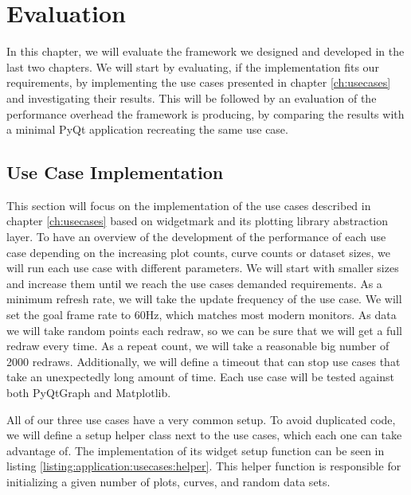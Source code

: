 
\chapter{Evaluation}
\label{ch:evaluation}

In this chapter, we will evaluate the framework we designed and developed in the
last two chapters. We will start by evaluating, if the implementation fits our
requirements, by implementing the use cases presented in chapter
\ref{ch:usecases} and investigating their results. This will be followed by an
evaluation of the performance overhead the framework is producing, by comparing
the results with a minimal PyQt application recreating the same use case.


\section{Use Case Implementation}

This section will focus on the implementation of the use cases described in
chapter \ref{ch:usecases} based on widgetmark and its plotting library
abstraction layer. To have an overview of the development of the performance
of each use case depending on the increasing plot counts, curve counts or dataset
sizes, we will run each use case with different parameters. We will start with
smaller sizes and increase them until we reach the use cases demanded
requirements. As a minimum refresh rate, we will take the update frequency of the
use case. We will set the goal frame rate to 60Hz, which matches most modern
monitors. As data we will take random points each redraw, so we can be sure that
we will get a full redraw every time. As a repeat count, we will take a
reasonable big number of 2000 redraws. Additionally, we will define a timeout
that can stop use cases that take an unexpectedly long amount of time. Each use
case will be tested against both PyQtGraph and Matplotlib.

All of our three use cases have a very common setup. To avoid duplicated code,
we will define a setup helper class next to the use cases, which each one can
take advantage of. The implementation of its widget setup function can be seen
in listing \ref{listing:application:usecases:helper}. This helper function is
responsible for initializing a given number of plots, curves, and random data
sets.

